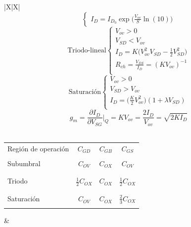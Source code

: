\documentclass[../main.tex]{subfiles}
\begin{document}
\begin{xltabular}{\textwidth}{|X|X|}
$$\begin{cases}
      I_D = I_{D_0}\exp\bigg(\frac{V_{ov}}{S}\ln(10)\bigg)
    \end{cases}$$
  $$\text{Triodo-lineal}\begin{cases}
      V_{ov} > 0                                              \\
      V_{SD} < V_{ov}                                         \\
      I_D = K\bigg(V_{ov}^2V_{SD} - \frac{1}{2}V_{SD}^2\bigg) \\
      R_{ch} = \frac{V_{DS}}{I_D} = (KV_{ov})^{-1}            \\
    \end{cases}$$
  $$\text{Saturación}\begin{cases}
      V_{ov} > 0                                              \\
      V_{SD} > V_{ov}                                         \\
      I_D = \bigg(\frac{K}{2}V_{ov}^2\bigg)(1+\lambda V_{SD}) \\
    \end{cases}$$
  $$g_m = \frac{\partial I_D}{\partial V_{SG}}\bigg|_Q = KV_{ov} = \frac{2I_D}{V_{ov}} = \sqrt{2KI_D}$$
  \\
  \hline

  \begin{center}
    \begin{tabular}{|l|c|c|c|}
      \firsthline
      \multicolumn{4}{|c|}{\textbf{Capacitancias parásitas}}                     \\
      \hline
      Región de operación & $C_{GD}$            & $C_{GB}$ & $C_{GS}$            \\
      \hline
                          &                     &          &                     \\
      Subumbral           & $C_{OV}$            & $C_{OX}$ & $C_{OV}$            \\
                          &                     &          &                     \\
      \hline
                          &                     &          &                     \\
      Triodo              & $\frac{1}{2}C_{OX}$ & $C_{OX}$ & $\frac{1}{2}C_{OX}$ \\
                          &                     &          &                     \\
      \hline
                          &                     &          &                     \\
      Saturación          & $C_{OV}$            & $C_{OX}$ & $\frac{2}{3}C_{OX}$ \\
                          &                     &          &                     \\
      \hline
    \end{tabular}\end{center}
  &
  \\
  \hline
\end{xltabular}
\end{document}
